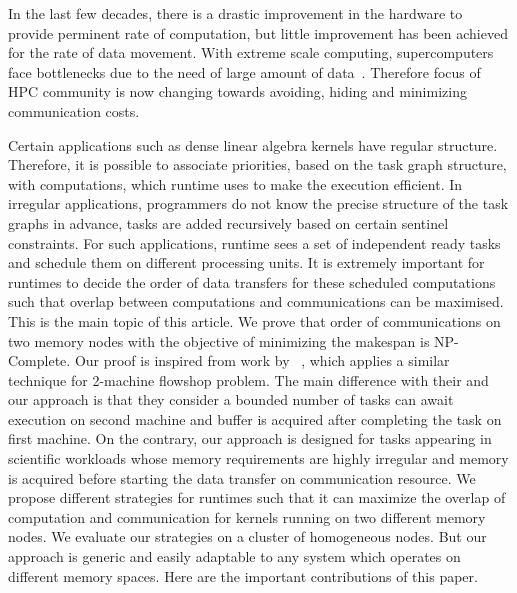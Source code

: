 \documentclass[sigconf]{acmart}
\begin{document}
	
	
	
	In the last few decades, there is a drastic improvement in the hardware to provide perminent rate of computation, but little improvement has been achieved for the rate of data movement. With extreme scale computing, supercomputers face bottlenecks due to the need of large amount of data~\cite{ascaccommitteereport2014,yelick2016}. Therefore focus of HPC community is now changing towards avoiding, hiding and minimizing communication costs.
	
	
	Certain applications such as dense linear algebra kernels have regular structure. Therefore, it is possible to associate priorities, based on the task graph structure, with computations, which runtime uses to make the execution efficient. In irregular applications, programmers do not know the precise structure of the task graphs in advance, tasks are added recursively based on certain sentinel constraints. For such applications, runtime sees a set of independent ready tasks and schedule them on different processing units. It is extremely important for runtimes to decide the order of data transfers for these scheduled computations such that overlap between computations and communications can be maximised. This is the main topic of this article. We prove that order of communications on two memory nodes with the objective of minimizing the makespan is NP-Complete. Our proof is inspired from work by ~\cite{Papadimitriou:1980:FSL:322203.322213}, which applies a similar technique for 2-machine flowshop problem. The main difference with their and our approach is that they consider a bounded number of tasks can await execution on second machine and buffer is acquired after completing the task on first machine. On the contrary, our approach is designed for tasks appearing in scientific workloads whose memory requirements are highly irregular and memory is acquired before starting the data transfer on communication resource. We propose different strategies for runtimes such that it can maximize the overlap of computation and communication for kernels running on two different memory nodes. We evaluate our strategies on a cluster of homogeneous nodes. But our approach is generic and easily adaptable to any system which operates on different memory spaces. Here are the important contributions of this paper.
	
\end{document}
